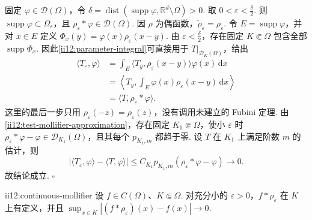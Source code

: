 \begin{FAProof}
固定 \(\displaystyle\varphi\in\mathcal D(\Omega)\)，令 \(\displaystyle \delta = \operatorname{dist}(\operatorname{supp}\varphi,\mathbb R^d\setminus\Omega)>0.\)
取 \(\displaystyle0<\varepsilon<\frac{\delta}{2}\). 则 \(\displaystyle\operatorname{supp}\varphi\subset\Omega_\varepsilon\)，且 \(\displaystyle\rho_\varepsilon*\varphi\in\mathcal D(\Omega)\). 因 \(\displaystyle\rho\) 为偶函数，\(\displaystyle\check\rho_\varepsilon=\rho_\varepsilon\). 令 \(\displaystyle E=\operatorname{supp}\varphi\)，并对 \(\displaystyle x\in E\) 定义 \(\displaystyle\Phi_x(y)=\varphi(x)\rho_\varepsilon(x-y)\). 由 \(\displaystyle\varepsilon<\frac{\delta}{2}\)，存在固定 \(\displaystyle K\Subset\Omega\) 包含全部 \(\displaystyle\operatorname{supp}\Phi_x\). 因此\autoref{ii12:parameter-integral}可直接用于 \(\displaystyle T|_{\mathcal D_K(\Omega)}\)，给出
\[
\begin{aligned}
\langle T_\varepsilon,\varphi\rangle
&=\int_E\langle T_y,\rho_\varepsilon(x-y)\rangle\varphi(x)\,\mathrm{d}x\\
&=\left\langle T_y,\int_E\varphi(x)\rho_\varepsilon(x-y)\,\mathrm{d}x\right\rangle\\
&=\langle T,\rho_\varepsilon*\varphi\rangle.
\end{aligned}
\]
这里的最后一步只用 \(\displaystyle\rho_\varepsilon(-z)=\rho_\varepsilon(z)\)，没有调用未建立的 Fubini 定理.
由\autoref{ii12:test-mollifier-approximation}，存在固定 \(\displaystyle K_1\Subset\Omega\)，使小 \(\displaystyle\varepsilon\) 时 \(\displaystyle\rho_\varepsilon*\varphi-\varphi\in\mathcal D_{K_1}(\Omega)\)，且其每个 \(\displaystyle p_{K_1,m}\) 都趋于零. 设 \(\displaystyle T\) 在 \(\displaystyle K_1\) 上满足阶数 \(\displaystyle m\) 的估计，则
\[
|\langle T_\varepsilon,\varphi\rangle-\langle T,\varphi\rangle|
\leqslant
C_{K_1}p_{K_1,m}(\rho_\varepsilon*\varphi-\varphi)
\longrightarrow0.
\]
故结论成立.
\hfill\(\square\)
\end{FAProof}

\begin{FAProposition}[B][连续函数的局部一致磨光核逼近]{ii12:continuous-mollifier}
设 \(\displaystyle f\in C(\Omega)\)、\(\displaystyle K\Subset\Omega\). 对充分小的 \(\displaystyle\varepsilon>0\)，\(\displaystyle f*\rho_\varepsilon\) 在 \(\displaystyle K\) 上有定义，并且 \(\displaystyle \sup_{x\in K}|(f*\rho_\varepsilon)(x)-f(x)|\longrightarrow0\).
\end{FAProposition}

